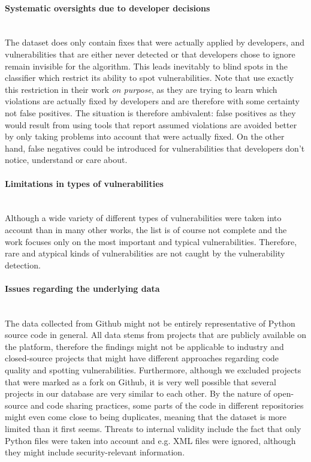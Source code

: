 \documentclass[
	a4paper,
	pagesize,
	pdftex,
	12pt,
	twoside, %
	BCOR=5mm, %
	ngerman,
	fleqn,
	final,
	]{scrartcl}
\begin{document}
\paragraph{Systematic oversights due to developer decisions}\mbox{}\\
The dataset does only contain fixes that were actually applied by developers, and vulnerabilities that are either never detected or that developers chose to ignore remain invisible for the algorithm. This leads inevitably to blind spots in the classifier which restrict its ability to spot vulnerabilities. Note that \cite{Liu.2018} use exactly this restriction in their work \textit{on purpose}, as they are trying to learn which violations are actually fixed by developers and are therefore with some certainty  not false positives. The situation is therefore ambivalent: false positives as they would result from using tools that report assumed violations are avoided better by only taking problems into account that were actually fixed. On the other hand, false negatives could be introduced for vulnerabilities that developers don't notice, understand or care about.
\paragraph{Limitations in types of vulnerabilities}\mbox{}\\
Although a wide variety of different types of vulnerabilities were taken into account than in many other works, the list is of course not complete and the work focuses only on the most important and typical vulnerabilities. Therefore, rare and atypical kinds of vulnerabilities are not caught by the vulnerability detection.
\paragraph{Issues regarding the underlying data}\mbox{}\\
The data collected from Github might not be entirely representative of Python source code in general. All data stems from projects that are publicly available on the platform, therefore the findings might not be applicable to industry and closed-source projects that might have different approaches regarding code quality and spotting vulnerabilities. Furthermore, although we excluded projects that were marked as a fork on Github, it is very well possible that several projects in our database are very similar to each other. By the nature of open-source and code sharing practices, some parts of the code in different repositories might even come close to being duplicates, meaning that the dataset is more limited than it first seems. Threats to internal validity include the fact that only Python files were taken into account and e.g. XML files were ignored, although they might include security-relevant information. 
\end{document}
